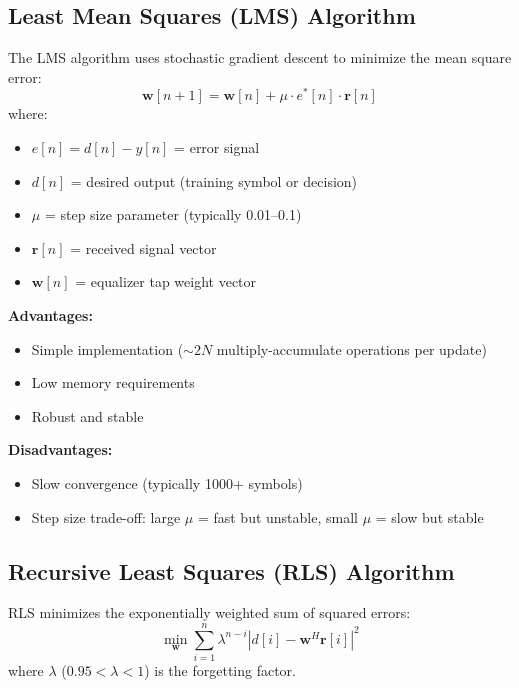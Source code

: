 \subsection{Least Mean Squares (LMS) Algorithm}

The LMS algorithm uses stochastic gradient descent to minimize the mean square error:
\begin{equation}
\mathbf{w}[n+1] = \mathbf{w}[n] + \mu \cdot e^*[n] \cdot \mathbf{r}[n]
\label{eq:lms-update}
\end{equation}
where:
\begin{itemize}
\item $e[n] = d[n] - y[n]$ = error signal
\item $d[n]$ = desired output (training symbol or decision)
\item $\mu$ = step size parameter (typically 0.01--0.1)
\item $\mathbf{r}[n]$ = received signal vector
\item $\mathbf{w}[n]$ = equalizer tap weight vector
\end{itemize}

\textbf{Advantages:}
\begin{itemize}
\item Simple implementation ($\sim 2N$ multiply-accumulate operations per update)
\item Low memory requirements
\item Robust and stable
\end{itemize}

\textbf{Disadvantages:}
\begin{itemize}
\item Slow convergence (typically 1000+ symbols)
\item Step size trade-off: large $\mu$ = fast but unstable, small $\mu$ = slow but stable
\end{itemize}

\subsection{Recursive Least Squares (RLS) Algorithm}

RLS minimizes the exponentially weighted sum of squared errors:
\begin{equation}
\min_{\mathbf{w}} \sum_{i=1}^{n} \lambda^{n-i} |d[i] - \mathbf{w}^H \mathbf{r}[i]|^2
\label{eq:rls-cost}
\end{equation}
where $\lambda$ ($0.95 < \lambda < 1$) is the forgetting factor.

